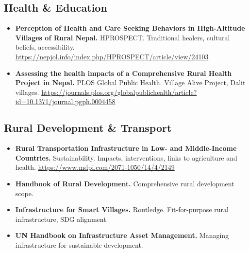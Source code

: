 \documentclass[11pt,a4paper]{article}
\begin{document}
\subsection{Health \& Education}
\begin{itemize}
    \item \textbf{Perception of Health and Care Seeking Behaviors in High-Altitude Villages of Rural Nepal.} HPROSPECT. Traditional healers, cultural beliefs, accessibility. \url{https://nepjol.info/index.php/HPROSPECT/article/view/24103}
    \item \textbf{Assessing the health impacts of a Comprehensive Rural Health Project in Nepal.} PLOS Global Public Health. Village Alive Project, Dalit villages. \url{https://journals.plos.org/globalpublichealth/article?id=10.1371/journal.pgph.0004458}
\end{itemize}

\subsection{Rural Development \& Transport}
\begin{itemize}
    \item \textbf{Rural Transportation Infrastructure in Low- and Middle-Income Countries.} Sustainability. Impacts, interventions, links to agriculture and health. \url{https://www.mdpi.com/2071-1050/14/4/2149}
    \item \textbf{Handbook of Rural Development.} Comprehensive rural development scope.
    \item \textbf{Infrastructure for Smart Villages.} Routledge. Fit-for-purpose rural infrastructure, SDG alignment.
    \item \textbf{UN Handbook on Infrastructure Asset Management.} Managing infrastructure for sustainable development.
\end{itemize}
\end{document}
